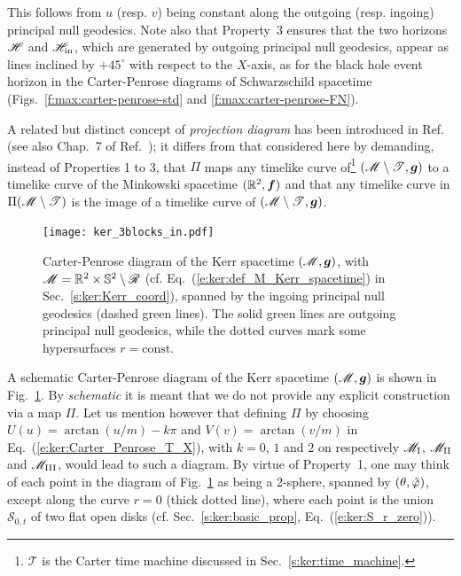 This follows from $u$ (resp. $v$) being constant along the outgoing (resp. ingoing)
principal null geodesics. Note also that
Property~3 ensures that the two horizons $\mathscr{H}$ and $\mathscr{H}_{\rm in}$, which are
generated by outgoing principal null geodesics,
appear as lines inclined by $+45^\circ$ with respect to the $X$-axis,
as for the black hole event horizon in the Carter-Penrose diagrams of
Schwarzschild spacetime (Figs.~\ref{f:max:carter-penrose-std} and \ref{f:max:carter-penrose-FN}).

\begin{remark}
A related but distinct concept of \emph{projection diagram}
has been introduced
in Ref.~\cite{ChrusOS12} (see also Chap.~7 of Ref.~\cite{Chrus20});
it differs from that considered here by demanding, instead of Properties 1 to 3,
that $\Pi$ maps any timelike curve of\footnote{$\mathscr{T}$ is the Carter time machine
discussed in Sec.~\ref{s:ker:time_machine}.}
 $(\mathscr{M}\setminus\mathscr{T},\bm{g})$ to a timelike curve of the Minkowski spacetime
$(\mathbb{R}^2, \bm{f})$ and that any timelike curve in $\Pi(\mathscr{M}\setminus\mathscr{T})$ is the image
of a timelike curve of $(\mathscr{M}\setminus\mathscr{T},\bm{g})$.
\end{remark}

\begin{figure}
\centerline{\texttt{[image: ker\_3blocks\_in.pdf]}}
\caption[]{\label{f:ker:3blocks_in} \footnotesize
Carter-Penrose diagram of the Kerr spacetime $(\mathscr{M},\bm{g})$, with
$\mathscr{M} = \mathbb{R}^2\times\mathbb{S}^2 \setminus \mathscr{R}$ (cf. Eq.~(\ref{e:ker:def_M_Kerr_spacetime}) in Sec.~\ref{s:ker:Kerr_coord}), spanned by the ingoing principal null geodesics (dashed green lines). The solid green lines are outgoing principal null geodesics, while
the dotted curves mark some hypersurfaces $r=\mathrm{const}$.}
\end{figure}

A schematic Carter-Penrose diagram of the Kerr spacetime $(\mathscr{M},\bm{g})$ is shown in
Fig.~\ref{f:ker:3blocks_in}.
By \emph{schematic} it is meant that we do not provide any explicit construction
via a map $\Pi$. Let us mention however that defining $\Pi$ by
choosing
$U(u) = \arctan(u/m) - k\pi$ and $V(v) = \arctan(v/m)$ in Eq.~(\ref{e:ker:Carter_Penrose_T_X}),
with $k=0$, $1$ and $2$
on respectively $\mathscr{M}_{\rm I}$, $\mathscr{M}_{\rm II}$ and $\mathscr{M}_{\rm III}$,
would lead to such a diagram.
By virtue of Property~1, one may think of each point in the diagram of
Fig.~\ref{f:ker:3blocks_in} as being a 2-sphere, spanned by $(\theta,{\tilde\varphi})$, except
along the curve $r=0$ (thick dotted line), where each point is the union $\mathcal{S}_{0,t}$
of two flat open disks (cf. Sec.~\ref{s:ker:basic_prop}, Eq.~(\ref{e:ker:S_r_zero})).

